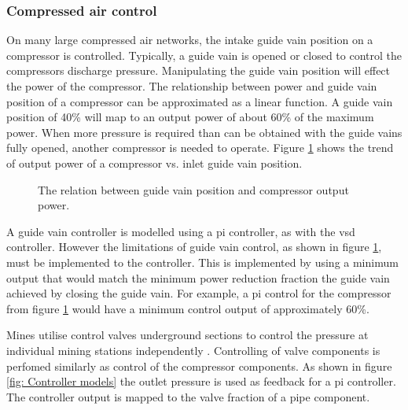 	\subsubsection{Compressed air control}
		On many large compressed air networks, the intake guide vain position on a compressor is controlled. Typically, a guide vain is opened or closed to control the compressors discharge pressure.  Manipulating the guide vain position will effect the power of the compressor. The relationship between power and guide vain position of a compressor can be approximated as a linear function. A guide vain position of 40\% will map to an output power of about 60\% of the maximum power. When more pressure is required than can be obtained with the guide vains fully opened, another compressor is needed to operate. Figure \ref{fig: Guide vain position} shows the trend of output power of a compressor vs. inlet guide vain position.
		\begin{figure}[h]
			\centering
			\fbox{}
			\caption[The relation between guide vain position and compressor output power.]{The relation between guide vain position and compressor output power.}
			\label{fig: Guide vain position}
		\end{figure}
		\par
		A guide vain controller is modelled using a \gls{pi} controller, as with the \gls{vsd} controller. However the limitations of guide vain control, as shown in figure \ref{fig: Guide vain position}, must be implemented to the controller. This is implemented by using a minimum output that would match the minimum power reduction fraction the guide vain achieved by closing the guide vain. For example, a \gls{pi} control for the compressor from figure \ref{fig: Guide vain position} would have a minimum control output of approximately 60\%.
		\par 
		Mines utilise control valves underground sections to control the pressure at individual mining stations independently \cite{Heyns2014Masters}. Controlling of valve components is perfomed similarly as control of the compressor components. As shown in figure \ref{fig: Controller models} the outlet pressure is used as feedback for a pi controller. The controller output is mapped to the valve fraction of a pipe component.
